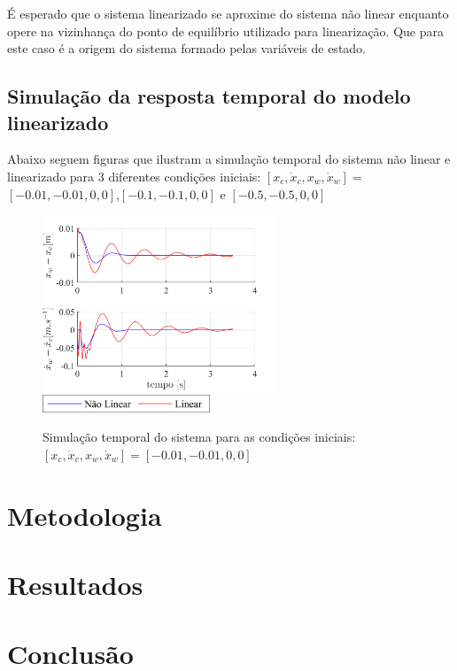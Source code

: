 \documentclass[a4paper]{ifacconf}
\begin{document}
    É esperado que o  sistema linearizado se aproxime do sistema não linear enquanto opere na vizinhança do ponto de equilíbrio utilizado para linearização. Que para este caso é a origem do sistema formado pelas variáveis de estado.
    \subsection{Simulação da resposta temporal do modelo linearizado}
    Abaixo seguem figuras que ilustram a simulação temporal do sistema não linear e linearizado para 3 diferentes condições iniciais: $[x_c,\dot{x}_c,x_w, \dot{x}_w]=$ $[-0.01,-0.01,0,0]$,$[-0.1,-0.1,0,0]$ e $[-0.5,-0.5,0,0]$
    
    \FloatBarrier
    \begin{figure}[htbp]
        \begin{centering}
            \includegraphics[width=7cm]{img/sim_temp_xc_n001_dxc_n001.png}
            \includegraphics[width=5cm]{img/Otimizacao_Leg.png}
            \caption{Simulação temporal do sistema para as condições iniciais:  $[x_c, \dot{x}_c, x_w, \dot{x}_w]=[-0.01,-0.01,0,0]$}
            \label{fig:sim_temp_xc_n01_dxc_n01}
        \end{centering}
    \end{figure}
    \FloatBarrier
    
    \section{Metodologia}
    \section{Resultados}
    \section{Conclusão}
    
\end{document}
